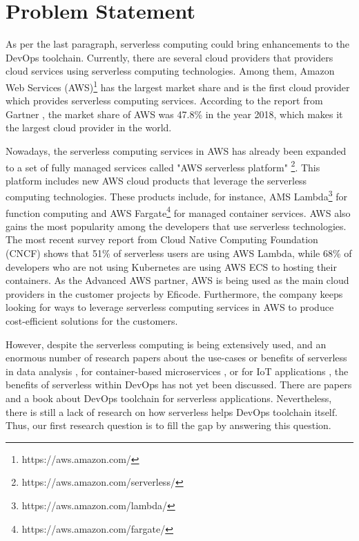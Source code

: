\section{Problem Statement}
As per the last paragraph, serverless computing could bring enhancements to the DevOps toolchain. Currently, there are several cloud providers that providers cloud services using serverless computing technologies. 
Among them, Amazon Web Services (AWS)\footnote{https://aws.amazon.com/} has the largest market share and is the first cloud provider which provides serverless computing services. According to the report from Gartner \cite{GartnerS47:online}, the market share of AWS was 47.8\% in the year 2018, which makes it the largest cloud provider in the world.
\par
Nowadays, the serverless computing services in AWS has already been expanded to a set of fully managed services called "AWS serverless platform" \footnote{https://aws.amazon.com/serverless/}. This platform includes new AWS cloud products that leverage the serverless computing technologies. These products include, for instance, AMS Lambda\footnote{https://aws.amazon.com/lambda/} for function computing and AWS Fargate\footnote{https://aws.amazon.com/fargate/} for managed container services.
AWS also gains the most popularity among the developers that use serverless technologies. The most recent survey report \cite{cncf2020} from Cloud Native Computing Foundation (CNCF) shows that 51\% of serverless users are using AWS Lambda, while 68\% of developers who are not using Kubernetes are using AWS ECS to hosting their containers.
As the Advanced AWS partner, AWS is being used as the main cloud providers in the customer projects by Eficode. Furthermore, the company keeps looking for ways to leverage serverless computing services in AWS to produce cost-efficient solutions for the customers.
\par
However, despite the serverless computing is being extensively used, and an enormous number of research papers about the use-cases or benefits of serverless in data analysis \cite{8457831}, for container-based microservices \cite{perez2018serverless}, or for IoT applications \cite{nastic2017serverless} \cite{glikson2017deviceless}, the benefits of serverless within DevOps has not yet been discussed. There are papers \cite{ivanov2018implementation} and a book \cite{bangera2018devops} about DevOps toolchain for serverless applications. Nevertheless, there is still a lack of research on how serverless helps DevOps toolchain itself. Thus, our first research question is to fill the gap by answering this question. 
